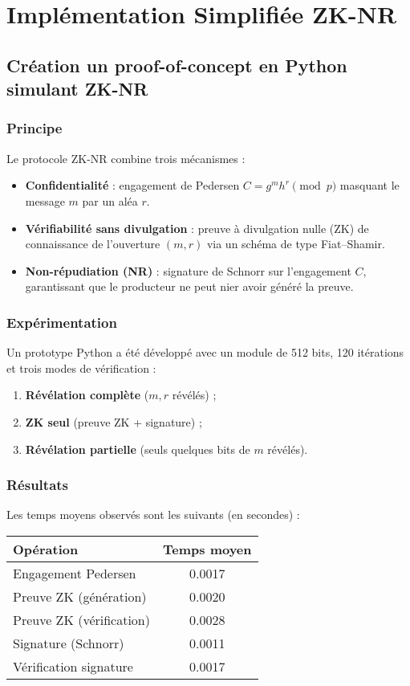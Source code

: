 \documentclass[12pt,a4paper]{article}
\begin{document}
	 \section{Implémentation Simplifiée ZK-NR}
	 \subsection{Création un proof-of-concept en Python simulant ZK-NR}
	 
	 \subsubsection{Principe}
	 Le protocole ZK-NR combine trois mécanismes :
	 \begin{itemize}
	 	\item \textbf{Confidentialité} : engagement de Pedersen $C = g^m h^r \pmod{p}$ masquant le message $m$ par un aléa $r$.
	 	\item \textbf{Vérifiabilité sans divulgation} : preuve à divulgation nulle (ZK) de connaissance de l'ouverture $(m,r)$ via un schéma de type Fiat--Shamir.
	 	\item \textbf{Non-répudiation (NR)} : signature de Schnorr sur l'engagement $C$, garantissant que le producteur ne peut nier avoir généré la preuve.
	 \end{itemize}
	 
	 \subsubsection{Expérimentation}
	 Un prototype Python a été développé avec un module de 512 bits, 
	 120 itérations et trois modes de vérification :
	 \begin{enumerate}
	 	\item \textbf{Révélation complète} ($m,r$ révélés) ;
	 	\item \textbf{ZK seul} (preuve ZK + signature) ;
	 	\item \textbf{Révélation partielle} (seuls quelques bits de $m$ révélés).
	 \end{enumerate}
	 
	 \subsubsection{Résultats}
	 Les temps moyens observés sont les suivants (en secondes) :
	 
	 \begin{center}
	 	\begin{tabular}{|l|c|}
	 		\hline
	 		Opération & Temps moyen \\
	 		\hline
	 		Engagement Pedersen & 0.0017 \\
	 		Preuve ZK (génération) & 0.0020 \\
	 		Preuve ZK (vérification) & 0.0028 \\
	 		Signature (Schnorr) & 0.0011 \\
	 		Vérification signature & 0.0017 \\
	 		\hline
	 	\end{tabular}
	 \end{center}
	 
\end{document}
